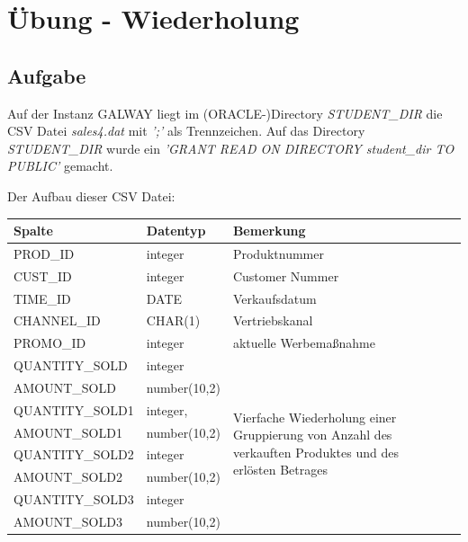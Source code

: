 \section{Übung - Wiederholung}
\label{sec:uebung_12}

\label{subsec:uebung_12.aufgabe_01}
\subsection{Aufgabe}
Auf der Instanz GALWAY liegt im (ORACLE-)Directory \textit{STUDENT\_DIR} die CSV Datei \textit{sales4.dat} mit \textit{';'} als Trennzeichen. Auf das Directory \textit{STUDENT\_DIR} wurde ein \textit{'GRANT READ ON DIRECTORY  student\_dir TO PUBLIC'} gemacht.

Der Aufbau dieser CSV Datei:

\begin{table}[H]
  \centering
  \begin{tabular}{|l|l|l|l|l|}
    \hline
    \textbf{Spalte} & \textbf{Datentyp} & \textbf{Bemerkung} \\
    \hline
    PROD\_ID        & integer           & Produktnummer \\
    \hline
    CUST\_ID        & integer           & Customer Nummer \\
    \hline
    TIME\_ID        & DATE              & Verkaufsdatum \\
    \hline
    CHANNEL\_ID     & CHAR(1)           & Vertriebskanal \\
    \hline
    PROMO\_ID       & integer           & aktuelle Werbemaßnahme \\
    \hline
    QUANTITY\_SOLD  & integer           & \multirow{8}{*}{\parbox{7.5cm}{Vierfache Wiederholung einer Gruppierung von Anzahl des verkauften Produktes und des erlösten Betrages}}         \\
    AMOUNT\_SOLD    & number(10,2)      & \\
    QUANTITY\_SOLD1 & integer,          & \\
    AMOUNT\_SOLD1   & number(10,2)      & \\
    QUANTITY\_SOLD2 & integer           & \\
    AMOUNT\_SOLD2   & number(10,2)      & \\
    QUANTITY\_SOLD3 & integer           & \\
    AMOUNT\_SOLD3   & number(10,2)      & \\
    \hline
  \end{tabular}
\end{table}


